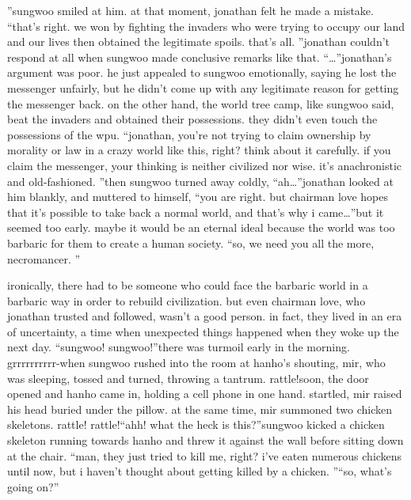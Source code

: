”sungwoo smiled at him.
at that moment, jonathan felt he made a mistake.
“that’s right.
 we won by fighting the invaders who were trying to occupy our land and our lives then obtained the legitimate spoils.
 that’s all.
”jonathan couldn’t respond at all when sungwoo made conclusive remarks like that.
“…”jonathan’s argument was poor.
 he just appealed to sungwoo emotionally, saying he lost the messenger unfairly, but he didn’t come up with any legitimate reason for getting the messenger back.
on the other hand, the world tree camp, like sungwoo said, beat the invaders and obtained their possessions.
 they didn’t even touch the possessions of the wpu.
“jonathan, you’re not trying to claim ownership by morality or law in a crazy world like this, right? think about it carefully.
 if you claim the messenger, your thinking is neither civilized nor wise.
 it’s anachronistic and old-fashioned.
”then sungwoo turned away coldly, “ah…”jonathan looked at him blankly, and muttered to himself, “you are right.
 but chairman love hopes that it’s possible to take back a normal world, and that’s why i came…”but it seemed too early.
 maybe it would be an eternal ideal because the world was too barbaric for them to create a human society.
“so, we need you all the more, necromancer.
”

ironically, there had to be someone who could face the barbaric world in a barbaric way in order to rebuild civilization.
but even chairman love, who jonathan trusted and followed, wasn’t a good person.
in fact, they lived in an era of uncertainty, a time when unexpected things happened when they woke up the next day.
“sungwoo! sungwoo!”there was turmoil early in the morning.
grrrrrrrrrr-when sungwoo rushed into the room at hanho’s shouting, mir, who was sleeping, tossed and turned, throwing a tantrum.
rattle!soon, the door opened and hanho came in, holding a cell phone in one hand.
startled, mir raised his head buried under the pillow.
 at the same time, mir summoned two chicken skeletons.
rattle! rattle!“ahh! what the heck is this?”sungwoo kicked a chicken skeleton running towards hanho and threw it against the wall before sitting down at the chair.
“man, they just tried to kill me, right? i’ve eaten numerous chickens until now, but i haven’t thought about getting killed by a chicken.
”“so, what’s going on?”

 